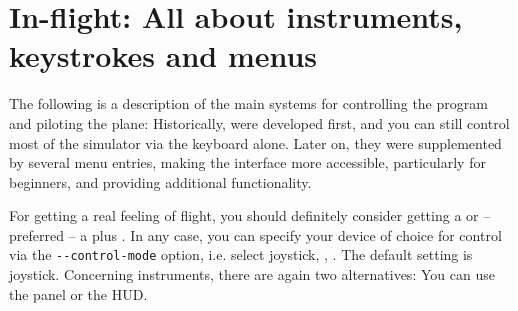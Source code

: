 
\chapter{In-flight: All about instruments, keystrokes and menus\label{flight}}

The following is a description of the main systems for controlling the
program and piloting the plane: Historically,  were developed
first, and you can still control most of the simulator via the keyboard alone. Later on,
they were supplemented by several menu entries, making the interface more accessible,
particularly for beginners, and providing additional functionality. 

For getting a real feeling of flight, you should definitely consider getting a  or -- preferred -- a  plus . In any case, you
can specify your device of choice for control via the \texttt{-$ $-control-mode} option,
i.e. select joystick, , . The default setting is joystick.
Concerning instruments, there are again two alternatives: You can use the panel or the
HUD.

